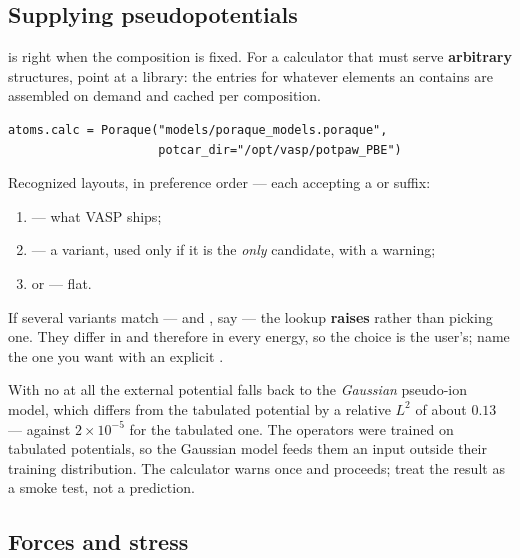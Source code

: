 \subsection{Supplying pseudopotentials}

 is right when the composition is fixed. For a calculator that must
serve \textbf{arbitrary} structures, point  at a 
library: the entries for whatever elements an  contains are
assembled on demand and cached per composition.

\begin{lstlisting}
atoms.calc = Poraque("models/poraque_models.poraque",
                     potcar_dir="/opt/vasp/potpaw_PBE")
\end{lstlisting}

Recognized layouts, in preference order --- each accepting a  or
 suffix:

\begin{enumerate}
  \item {} --- what VASP ships;
  \item {} --- a variant, used only if it is the
    \emph{only} candidate, with a warning;
  \item {} or  --- flat.
\end{enumerate}

\begin{pnote}
If several variants match ---  and , say --- the lookup
\textbf{raises} rather than picking one. They differ in  and
therefore in every energy, so the choice is the user's; name the one you want
with an explicit .
\end{pnote}

\begin{pwarn}
With no  at all the external potential falls back to the
\emph{Gaussian} pseudo-ion model, which differs from the tabulated potential by
a relative $L^{2}$ of about $0.13$ --- against $2\times10^{-5}$ for the
tabulated one. The operators were trained on tabulated potentials, so the
Gaussian model feeds them an input outside their training distribution. The
calculator warns once and proceeds; treat the result as a smoke test, not a
prediction.
\end{pwarn}

\subsection{Forces and stress}

